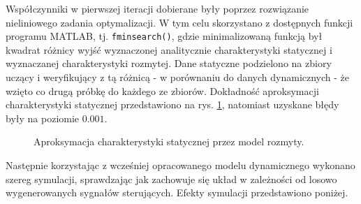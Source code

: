 \documentclass[a4paper,titlepage,11pt,floatssmall]{mwrep}
\begin{document}
Współczynniki w pierwszej iteracji dobierane były poprzez rozwiązanie nieliniowego zadania optymalizacji. W tym celu skorzystano z dostępnych funkcji programu MATLAB, tj. \verb+fminsearch()+, gdzie minimalizowaną funkcją był kwadrat różnicy wyjść wyznaczonej analitycznie charakterystyki statycznej i wyznaczanej charakterystyki rozmytej. Dane statyczne podzielono na zbiory uczący i weryfikujący z tą różnicą - w porównaniu do danych dynamicznych - że wzięto co drugą próbkę do każdego ze zbiorów. Dokładność aproksymacji charakterystyki statycznej przedstawiono na rys. \ref{static_hamm}, natomiast uzyskane błędy były na poziomie $\num{0.001}$. 

\begin{figure}[h!]
\centering
{}
\hfill
{}
\caption{Aproksymacja charakterystyki statycznej przez model rozmyty.}
\label{static_hamm}
\end{figure}

Następnie korzystając z wcześniej opracowanego modelu dynamicznego wykonano szereg symulacji, sprawdzając jak zachowuje się układ w zależności od losowo wygenerowanych sygnałów sterujących. Efekty symulacji przedstawiono poniżej.

\end{document}

